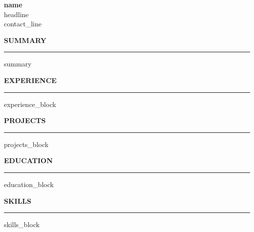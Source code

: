 \documentclass[11pt,a4paper]{article}
\newcommand{\heading}[1]{%
  \vspace{6pt}\noindent\textbf{\uppercase{#1}}\\[-6pt]%
  \noindent\rule{\linewidth}{0.4pt}\vspace{2pt}}
\begin{document}
\begin{center}
  {\LARGE\textbf{{{name}}}}\\[3pt]
  {\normalsize {{headline}}}\\[3pt]
  {\small {{contact_line}}}
\end{center}

\heading{Summary}
{{summary}}

\heading{Experience}
{{experience_block}}

\heading{Projects}
{{projects_block}}

\heading{Education}
{{education_block}}

\heading{Skills}
{{skills_block}}
\end{document}

